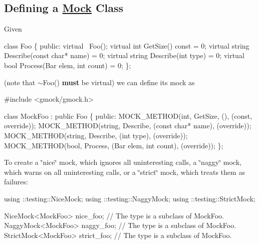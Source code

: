 \subsection*{Defining a \mbox{\hyperlink{classMock}{Mock}} Class}

Given


\begin{DoxyCode}
\textcolor{keyword}{class }Foo \{
 \textcolor{keyword}{public}:
  \textcolor{keyword}{virtual} ~Foo();
  \textcolor{keyword}{virtual} \textcolor{keywordtype}{int} GetSize() \textcolor{keyword}{const} = 0;
  \textcolor{keyword}{virtual} \textcolor{keywordtype}{string} Describe(\textcolor{keyword}{const} \textcolor{keywordtype}{char}* name) = 0;
  \textcolor{keyword}{virtual} \textcolor{keywordtype}{string} Describe(\textcolor{keywordtype}{int} type) = 0;
  \textcolor{keyword}{virtual} \textcolor{keywordtype}{bool} Process(Bar elem, \textcolor{keywordtype}{int} count) = 0;
\};
\end{DoxyCode}


(note that {\ttfamily $\sim$\+Foo()} {\bfseries must} be virtual) we can define its mock as


\begin{DoxyCode}
\textcolor{preprocessor}{#include <gmock/gmock.h>}

\textcolor{keyword}{class }MockFoo : \textcolor{keyword}{public} Foo \{
 \textcolor{keyword}{public}:
  MOCK\_METHOD(\textcolor{keywordtype}{int}, GetSize, (), (\textcolor{keyword}{const}, \textcolor{keyword}{override}));
  MOCK\_METHOD(\textcolor{keywordtype}{string}, Describe, (\textcolor{keyword}{const} \textcolor{keywordtype}{char}* name), (\textcolor{keyword}{override}));
  MOCK\_METHOD(\textcolor{keywordtype}{string}, Describe, (\textcolor{keywordtype}{int} type), (\textcolor{keyword}{override}));
  MOCK\_METHOD(\textcolor{keywordtype}{bool}, Process, (Bar elem, \textcolor{keywordtype}{int} count), (\textcolor{keyword}{override}));
\};
\end{DoxyCode}


To create a \char`\"{}nice\char`\"{} mock, which ignores all uninteresting calls, a \char`\"{}naggy\char`\"{} mock, which warns on all uninteresting calls, or a \char`\"{}strict\char`\"{} mock, which treats them as failures\+:


\begin{DoxyCode}
using ::testing::NiceMock;
using ::testing::NaggyMock;
using ::testing::StrictMock;

NiceMock<MockFoo> nice\_foo;      \textcolor{comment}{// The type is a subclass of MockFoo.}
NaggyMock<MockFoo> naggy\_foo;    \textcolor{comment}{// The type is a subclass of MockFoo.}
StrictMock<MockFoo> strict\_foo;  \textcolor{comment}{// The type is a subclass of MockFoo.}
\end{DoxyCode}


